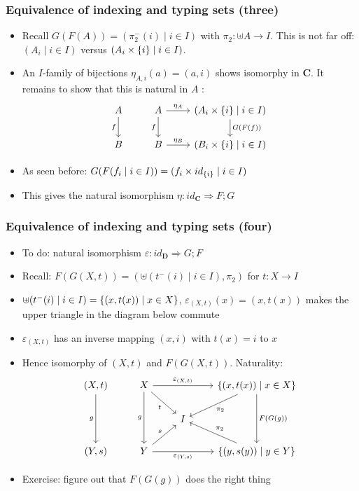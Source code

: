 \documentclass[handout]{beamer}
\newcommand{\To}{\Rightarrow}
\newcommand{\bfsf}[1]{{\boldsymbol{#1}}}
\newcommand{\CC}{\bfsf{C}}
\newcommand{\DD}{\bfsf{D}}
\begin{document}
\frame
  {   
    \frametitle{Equivalence of indexing and typing sets (three)}\label{Ch3:Eq-ind-typ-Set-eta}

 \begin{itemize}[<+->]

\item Recall $G(F(A)) = (\pi_2^-(i) \mid i\in I)$ with $\pi_2: \uplus A \to I$.
This is not far off: $(A_i\mid  i\in I)$ versus $(A_i\times \{i\}\mid  i\in I)$.
\item An $I$-family of bijections $\eta_{A,i}(a)= (a,i)$ shows isomorphy in $\CC$.
It remains to show that this is natural in $A$ :
\[
\begin{tikzcd}[ampersand replacement=\&]
A \arrow[swap]{d}{f} \& A  \arrow[swap]{d}{f}\arrow{r}{\eta_A} 
\&\arrow{d}{G(F(f))} (A_i\times \set{i}\mid  i\in I)\\
B \& B  \arrow{r}{\eta_B} \& (B_i\times \set{i}\mid  i\in I)
\end{tikzcd}
\]
\item As seen before: $G(F(f_i \mid i\in I)) = (f_i \times id_{\{i\}} \mid i\in I)$
\item This gives the natural isomorphism $\eta: id_\CC \To F;G$
 \end{itemize}

 }

\frame
  {   
    \frametitle{Equivalence of indexing and typing sets (four)}\label{Ch3:Eq-ind-typ-Set-eps}

 \begin{itemize}[<+->]
\item To do: natural isomorphism $\varepsilon :  id_\DD \To G;F$
\item Recall: $F(G(X,t)) = (\uplus(t^-(i) \mid i\in I),\pi_2)$ for $t:X\to I$
\item  $\uplus(t^-(i) \mid i\in I) = \{(x,t(x))\mid x\in X\}$,
$\varepsilon_{(X,t)}(x) = (x,t(x))$ makes the upper triangle in the diagram below commute
\item $\varepsilon_{(X,t)}$ has an inverse mapping $(x,i)$ with $t(x)=i$ to $x$
\item Hence isomorphy of $(X,t)$ and $F(G(X,t))$.  Naturality:
\[
\begin{tikzcd}[ampersand replacement=\&]
(X,t) \arrow[swap]{dd}{g} \& X  \arrow[swap]{dd}{g}\arrow[swap]{dr}{t}\arrow{rr}{\varepsilon_{(X,t)}} 
\&\&\arrow{dd}{F(G(g))}  \set{(x,t(x))\mid x\in X}\arrow{dl}{\pi_2} \\
\&\&I\\
(Y,s) \& Y  \arrow[swap]{rr}{\varepsilon_{(Y,s)}}\arrow{ur}{s} 
\&\&  \set{(y,s(y))\mid y\in Y} \arrow[swap]{ul}{\pi_2}
\end{tikzcd}
\]
\item Exercise: figure out that $F(G(g))$ does the right thing
 \end{itemize}

 }
\end{document}
